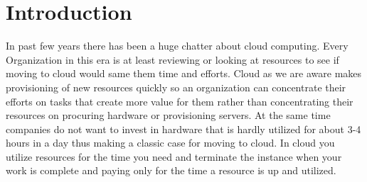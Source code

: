 \chapter{Introduction}\label{chap:introduction}

In past few years there has been a huge chatter about cloud computing. Every Organization in this era is at least reviewing or looking at resources to see if moving to cloud would same them time and efforts. Cloud as we are aware makes provisioning of new resources quickly so an organization can concentrate their efforts on tasks that create more value for them rather than concentrating their resources on procuring hardware or provisioning servers. At the same time companies do not want to invest in hardware that is hardly utilized for about 3-4 hours in a day thus making a classic case for moving to cloud. In cloud you utilize resources for the time you need and terminate the instance when your work is complete and paying only for the time a resource is up and utilized. 

